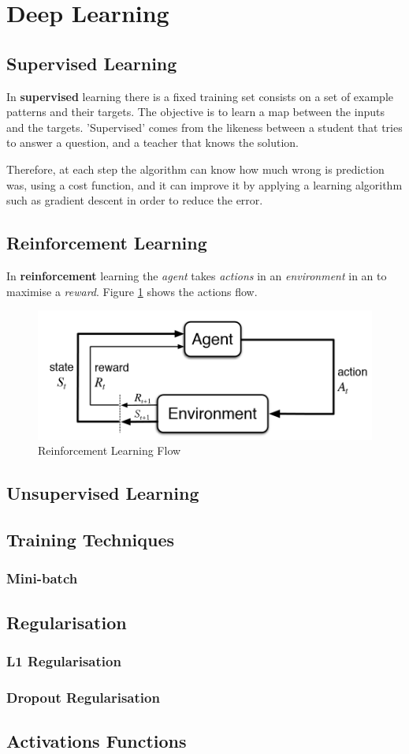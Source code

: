 \documentclass[11pt]{article}
\begin{document}
\section{Deep Learning}
\subsection{Supervised Learning}
In \textbf{supervised} learning there is a fixed training set consists on a set of example patterns and their targets. The objective is to learn a map between the inputs and the targets. 'Supervised' comes from the likeness between a student that tries to answer a question, and a teacher that knows the solution.

Therefore, at each step the algorithm can know how much wrong is prediction was, using a cost function, and it can improve it by applying a learning algorithm such as gradient descent in order to reduce the error.

\subsection{Reinforcement Learning}
In \textbf{reinforcement} learning the \emph{agent} takes \emph{actions} in an \emph{environment} in an to maximise a \emph{reward}. Figure \ref{fig: reinforcement_flow} shows the actions flow.

\begin{figure}[h]
\centering
	\includegraphics[scale=0.5]{images/reinforcement}
	\caption{Reinforcement Learning Flow}
	\label{fig: reinforcement_flow}
\end{figure}
\subsection{Unsupervised Learning}

\subsection{Training Techniques}
\subsubsection{Mini-batch}
\subsection{Regularisation}
\subsubsection{L1 Regularisation}
\subsubsection{Dropout Regularisation}
\subsection{Activations Functions}
\end{document}
